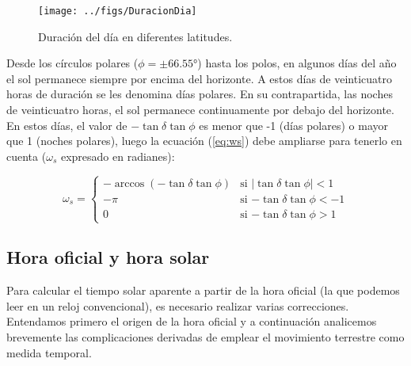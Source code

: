 \begin{figure}
\begin{centering}
\texttt{[image: ../figs/DuracionDia]}
\end{centering}

\caption{Duración del día en diferentes latitudes.\label{fig:Duracion-del-Dia}}

\end{figure}

Desde los círculos polares ($\phi=\pm \ang{66.55}$) hasta los polos,
en algunos días del año el sol permanece siempre por encima del
horizonte. A estos días de veinticuatro horas de duración se les
denomina días polares. En su contrapartida, las noches de veinticuatro
horas, el sol permanece continuamente por debajo del horizonte. En
estos días, el valor de $-\tan\delta\tan\phi$ es menor que -1 (días
polares) o mayor que 1 (noches polares), luego la ecuación
(\ref{eq:ws}) debe ampliarse para tenerlo en cuenta ($\omega_s$ expresado en radianes):

\begin{equation}
\omega_s=\begin{cases}
-\arccos(-\tan\delta\tan\phi)& \text{si $|\tan\delta\tan\phi|<1$}\\
  -\pi& \text{si $-\tan\delta\tan\phi<-1$}\\
  0& \text{si $-\tan\delta\tan\phi>1$}
\end{cases}
\label{ws_polar}
\end{equation}


\subsection{Hora oficial y hora solar}

Para calcular el tiempo solar aparente a partir de la hora oficial
(la que podemos leer en un reloj convencional), es necesario realizar
varias correcciones. Entendamos primero el origen de la hora oficial
y a continuación analicemos brevemente las complicaciones derivadas
de emplear el movimiento terrestre como medida temporal.

